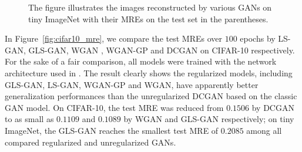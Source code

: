 \begin{figure}[h]
{\begin{minipage}{0.25\linewidth}
\begin{center}
\end{center}
\end{minipage}}
   \caption{The figure illustrates the images reconstructed by various GANs on tiny ImageNet with their MREs on the test set in the parentheses.}\label{fig:reconstructed_cifar10}
\end{figure}

In Figure~\ref{fig:cifar10_mre}, we compare the test MREs over $100$ epochs by LS-GAN, GLS-GAN, WGAN \cite{wgan17}, WGAN-GP \cite{gulrajani2017improved} and DCGAN \cite{radford2015unsupervised} on CIFAR-10 respectively.
For the sake of a fair comparison, all models were trained with the network architecture used in \cite{radford2015unsupervised}.
The result clearly shows the regularized models, including GLS-GAN, LS-GAN, WGAN-GP and WGAN, have apparently better generalization performances than the unregularized DCGAN based on the classic GAN model. On CIFAR-10, the test MRE was reduced from $0.1506$ by DCGAN to as small as $0.1109$ and $0.1089$ by WGAN and GLS-GAN respectively; on tiny ImageNet, the GLS-GAN reaches the smallest test MRE of $0.2085$ among all compared regularized and unregularized GANs.


